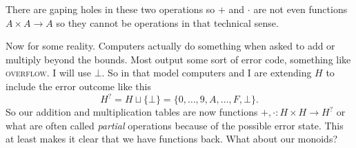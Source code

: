 \documentclass[12pt,twoside,letterpaper]{memoir}
\begin{document}
\begin{center}
\end{center}
There are gaping holes in these two operations so $+$ and $\cdot$ 
are not even functions $A\times A\to A$ so they cannot be operations
in that technical sense.  


Now for some reality.  Computers actually do something when asked 
to add or multiply beyond the bounds.  Most output some sort of 
error code, something like \textsc{overflow}.  I will 
use $\bot$.  So in that model computers and I are extending $H$ to include the 
error outcome like this
\[
    H^? = H\sqcup\{\bot\} = \{0,\ldots,9,A,\ldots, F,\bot\}.
\]
So our addition and multiplication tables are now functions 
$+,\cdot :H \times H\to H^?$ or what are often called \emph{partial}
operations because of the possible error state.  This at least makes 
it clear that we have functions back.  What about our monoids?
\end{document}
